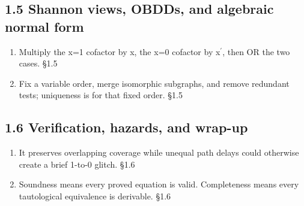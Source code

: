 \documentclass[11pt]{article}
\begin{document}
\begin{keepsection}\subsection{1.5 Shannon views, OBDDs, and algebraic normal form}

\begin{enumerate}
\item Multiply the x=1 cofactor by x, the x=0 cofactor by x\ensuremath{{}^{\prime}}, then OR the two cases. \hfill{\small\color{FAUblue}§1.5}
\item Fix a variable order, merge isomorphic subgraphs, and remove redundant tests; uniqueness is for that fixed order. \hfill{\small\color{FAUblue}§1.5}
\end{enumerate}

\end{keepsection}
\begin{keepsection}\subsection{1.6 Verification, hazards, and wrap-up}

\begin{enumerate}
\item It preserves overlapping coverage while unequal path delays could otherwise create a brief 1-to-0 glitch. \hfill{\small\color{FAUblue}§1.6}
\item Soundness means every proved equation is valid. Completeness means every tautological equivalence is derivable. \hfill{\small\color{FAUblue}§1.6}
\end{enumerate}

\end{keepsection}
\end{document}
